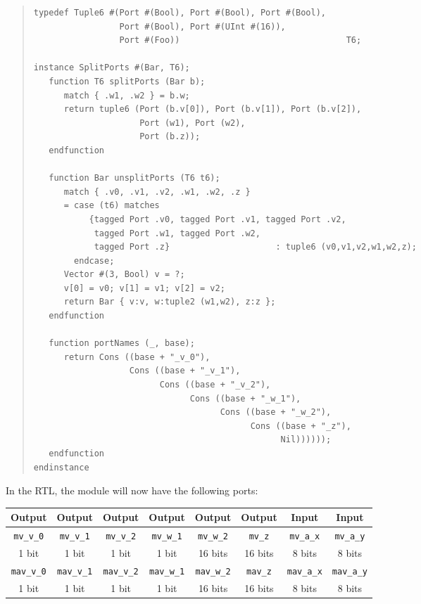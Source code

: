 \begin{quote}
\begin{verbatim}
typedef Tuple6 #(Port #(Bool), Port #(Bool), Port #(Bool),
                 Port #(Bool), Port #(UInt #(16)),
                 Port #(Foo))                                 T6;

instance SplitPorts #(Bar, T6);
   function T6 splitPorts (Bar b);
      match { .w1, .w2 } = b.w;
      return tuple6 (Port (b.v[0]), Port (b.v[1]), Port (b.v[2]),
                     Port (w1), Port (w2),
                     Port (b.z));
   endfunction

   function Bar unsplitPorts (T6 t6);
      match { .v0, .v1, .v2, .w1, .w2, .z }
      = case (t6) matches
           {tagged Port .v0, tagged Port .v1, tagged Port .v2,
            tagged Port .w1, tagged Port .w2,
            tagged Port .z}                     : tuple6 (v0,v1,v2,w1,w2,z);
        endcase;
      Vector #(3, Bool) v = ?;
      v[0] = v0; v[1] = v1; v[2] = v2;
      return Bar { v:v, w:tuple2 (w1,w2), z:z };
   endfunction

   function portNames (_, base);
      return Cons ((base + "_v_0"),
                   Cons ((base + "_v_1"),
                         Cons ((base + "_v_2"),
                               Cons ((base + "_w_1"),
                                     Cons ((base + "_w_2"),
                                           Cons ((base + "_z"),
                                                 Nil))))));
   endfunction
endinstance
\end{verbatim}
\end{quote}

In the RTL, the module will now have the following ports:

\begin{center}
  \begin{tabular}{|c|c|c|c|c|c||c|c|}
    \hline
     Output &
     Output &
     Output &
     Output &
     Output &
     Output &
     Input  &
     Input  \\
    \hline
     {\tt mv\_v\_0}  &
     {\tt mv\_v\_1}  &
     {\tt mv\_v\_2}  &
     {\tt mv\_w\_1}  &
     {\tt mv\_w\_2}  &
     {\tt mv\_z}     &
     {\tt mv\_a\_x}  &
     {\tt mv\_a\_y} \\
      1 bit  &
      1 bit  &
      1 bit  &
      1 bit  &
     16 bits &
     16 bits &
      8 bits &
      8 bits \\
    \hline
     {\tt mav\_v\_0}  &
     {\tt mav\_v\_1}  &
     {\tt mav\_v\_2}  &
     {\tt mav\_w\_1}  &
     {\tt mav\_w\_2}  &
     {\tt mav\_z}     &
     {\tt mav\_a\_x}  &
     {\tt mav\_a\_y} \\
      1 bit  &
      1 bit  &
      1 bit  &
      1 bit  &
     16 bits &
     16 bits &
      8 bits &
      8 bits \\
    \hline
  \end{tabular}
\end{center}

